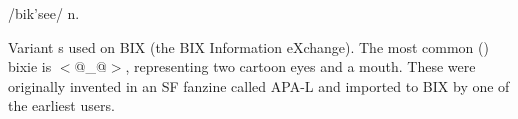  /bik'see/ n.

Variant s used on BIX (the BIX Information eXchange). The
most common () bixie is $<$@\_@$>$, representing two cartoon
eyes and a mouth. These were originally invented in an SF fanzine called APA-L
and imported to BIX by one of the earliest users.


